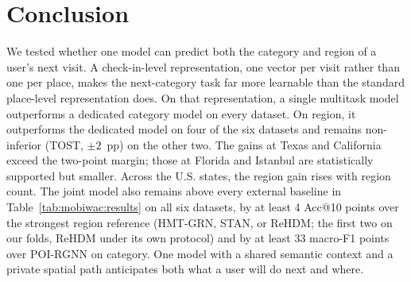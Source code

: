 \section{Conclusion}
\label{sec:mobiwac:conclusion}

We tested whether one model can predict both the category and region of a user's next visit. A check-in-level
representation, one vector per visit rather than one per place, makes the next-category task far more learnable than the standard
place-level representation does. On that representation, a single multitask model outperforms a dedicated category model on every dataset. On region, it outperforms the dedicated model on four of the six datasets and remains non-inferior (TOST, $\pm2$~pp) on the other two. The gains at Texas and California exceed the two-point margin; those at Florida and Istanbul are statistically supported but smaller. Across the U.S. states, the region gain rises with region count. The joint model also remains above every external baseline in Table~\ref{tab:mobiwac:results} on all six datasets, by at least 4 Acc@10 points over the strongest region reference (HMT-GRN, STAN, or ReHDM; the first two on our folds, ReHDM under its own protocol) and by at least 33 macro-F1 points over POI-RGNN on category. One model with a shared semantic context and a private spatial path anticipates both what a user will do next and where.
